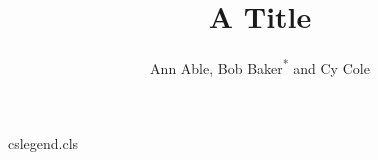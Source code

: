 \begin{filecontents*}[overwrite]{cslegend.cls}
\def\institute#1{\gdef\@institute{#1}}
\def\institutename{\par
 \begingroup
 \parskip=\z@
 \parindent=\z@
 \setcounter{@inst}{1}%
 \def\and{\par\stepcounter{@inst}%
 \noindent$^{\the@inst}$\enspace\ignorespaces}%
 \setbox0=\vbox{\def\thanks##1{}\@institute}%
 \ifnum\c@@inst=1\relax
 \else
   \setcounter{@inst}{1}%
   \noindent$^{\the@inst}$\enspace
 \fi
 \ignorespaces
 \@institute\par
 \endgroup}
\def\inst#1{\unskip$^{#1}$}
\def\@maketitle{\newpage\noindent{\Large\@title\par}\vskip6pt
  {\large\noindent\ignorespaces\@author\par}\vskip6pt
  {\small\institutename}}
\end{filecontents*}
\documentclass{cslegend}

\title{A Title}
\author{Ann Able\textsuperscript{\dag}, Bob Baker\textsuperscript{*} and Cy Cole\textsuperscript{\dag}}
\maketitle
Text.

